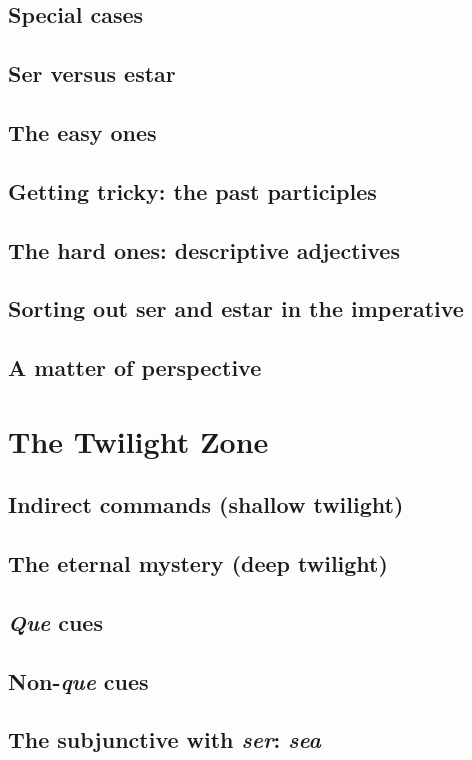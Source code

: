 \documentclass[14pt,a4paper,oneside]{memoir}
\begin{document}
\section{Special cases}
\section{Ser versus estar}
\section{The easy ones}
\section{Getting tricky: the past participles}
\section{The hard ones: descriptive adjectives}
\section{Sorting out ser and estar in the imperative}
\section{A matter of perspective}

\chapter{The Twilight Zone}

\section{Indirect commands (shallow twilight)}
\section{The eternal mystery (deep twilight)}
\section{\emph{Que} cues}
\section{Non-\emph{que} cues}
\section{The subjunctive with \emph{ser}: \emph{sea}}
\end{document}
